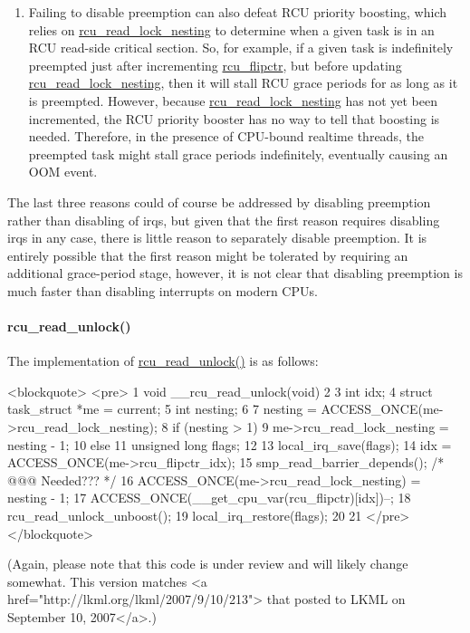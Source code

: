\begin{enumerate}
\item	Failing to disable preemption can also defeat RCU priority
	boosting, which relies on \url{rcu_read_lock_nesting}
	to determine when a given task is in an RCU read-side
	critical section.
	So, for example, if a given task is indefinitely
	preempted just after incrementing \url{rcu_flipctr},
	but before updating \url{rcu_read_lock_nesting},
	then it will stall RCU grace periods for as long as it
	is preempted.
	However, because \url{rcu_read_lock_nesting} has not
	yet been incremented, the RCU priority booster has no way
	to tell that boosting is needed.
	Therefore, in the presence of CPU-bound realtime threads,
	the preempted task might stall grace periods indefinitely,
	eventually causing an OOM event.
\end{enumerate}

The last three reasons could of course be addressed by disabling
preemption rather than disabling of irqs, but given that the first
reason requires disabling irqs in any case, there is little reason
to separately disable preemption.
It is entirely possible that the first reason might be tolerated
by requiring an additional grace-period stage, however, it is not
clear that disabling preemption is much faster than disabling
interrupts on modern CPUs.

\paragraph{rcu_read_unlock()}
\label{app:rcuimpl:rcu_read_unlock()}

The implementation of \url{rcu_read_unlock()} is as follows:

<blockquote>
<pre>  1 void __rcu_read_unlock(void)
  2 {
  3   int idx;
  4   struct task_struct *me = current;
  5   int nesting;
  6 
  7   nesting = ACCESS_ONCE(me->rcu_read_lock_nesting);
  8   if (nesting > 1) {
  9     me->rcu_read_lock_nesting = nesting - 1;
 10   } else {
 11     unsigned long flags;
 12 
 13     local_irq_save(flags);
 14     idx = ACCESS_ONCE(me->rcu_flipctr_idx);
 15     smp_read_barrier_depends();  /* @@@ Needed??? */
 16     ACCESS_ONCE(me->rcu_read_lock_nesting) = nesting - 1;
 17     ACCESS_ONCE(__get_cpu_var(rcu_flipctr)[idx])--;
 18     rcu_read_unlock_unboost();
 19     local_irq_restore(flags);
 20   }
 21 }
</pre>
</blockquote>

(Again, please note that this code is under review and will likely change
somewhat.
This version matches
<a href="http://lkml.org/lkml/2007/9/10/213">
that posted to LKML on September 10, 2007</a>.)

